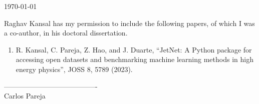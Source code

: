 \documentclass{article}
\begin{document}
\today

Raghav Kansal has my permission to include the following papers, of which
I was a co-author, in his doctoral dissertation.

\begin{enumerate}
    \item R. Kansal, C. Pareja, Z. Hao, and J. Duarte, “JetNet: A Python package for accessing open datasets and benchmarking machine learning methods in high energy physics”, JOSS 8, 5789 (2023).
\end{enumerate}

\baselineskip
----------------------------------------\\
Carlos Pareja
\end{document}

